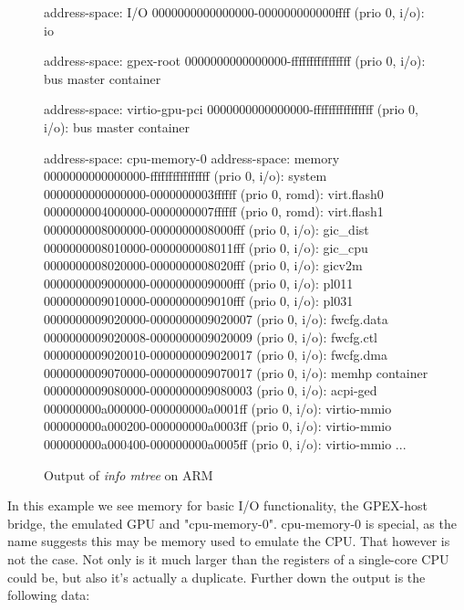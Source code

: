 \begin{figure}[H]
\begin{ffcode}
    address-space: I/O
    0000000000000000-000000000000ffff (prio 0, i/o): io

  address-space: gpex-root
    0000000000000000-ffffffffffffffff (prio 0, i/o): bus master container

  address-space: virtio-gpu-pci
    0000000000000000-ffffffffffffffff (prio 0, i/o): bus master container

  address-space: cpu-memory-0
  address-space: memory
    0000000000000000-ffffffffffffffff (prio 0, i/o): system
      0000000000000000-0000000003ffffff (prio 0, romd): virt.flash0
      0000000004000000-0000000007ffffff (prio 0, romd): virt.flash1
      0000000008000000-0000000008000fff (prio 0, i/o): gic_dist
      0000000008010000-0000000008011fff (prio 0, i/o): gic_cpu
      0000000008020000-0000000008020fff (prio 0, i/o): gicv2m
      0000000009000000-0000000009000fff (prio 0, i/o): pl011
      0000000009010000-0000000009010fff (prio 0, i/o): pl031
      0000000009020000-0000000009020007 (prio 0, i/o): fwcfg.data
      0000000009020008-0000000009020009 (prio 0, i/o): fwcfg.ctl
      0000000009020010-0000000009020017 (prio 0, i/o): fwcfg.dma
      0000000009070000-0000000009070017 (prio 0, i/o): memhp container
      0000000009080000-0000000009080003 (prio 0, i/o): acpi-ged
      000000000a000000-000000000a0001ff (prio 0, i/o): virtio-mmio
      000000000a000200-000000000a0003ff (prio 0, i/o): virtio-mmio
      000000000a000400-000000000a0005ff (prio 0, i/o): virtio-mmio
      ...
\end{ffcode}
\caption{Output of \emph{info mtree} on ARM}
\label{fig:mem_ARM}
\end{figure}

In this example we see memory for basic I/O functionality, the GPEX-host bridge, the emulated GPU and "cpu-memory-0".
cpu-memory-0 is special, as the name suggests this may be memory used to emulate the CPU. That however is not the case.
Not only is it much larger than the registers of a single-core CPU could be, but also it's actually a duplicate.
Further down the output is the following data:

